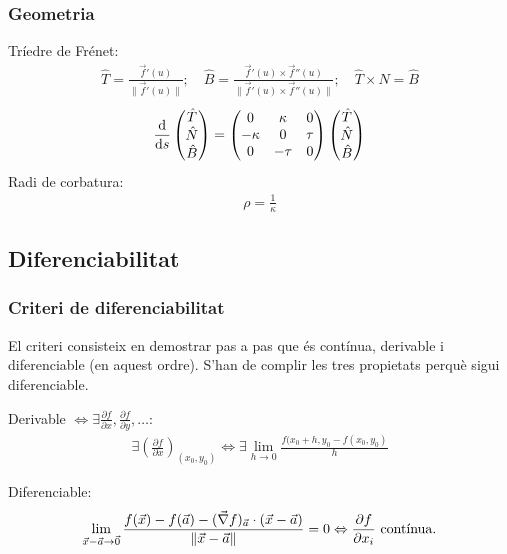\subsubsection*{Geometria}
Tríedre de Frénet:
\begin{align}
    \hat{T} = \frac{\vec{f}'(u)}{\| \vec{f}'(u) \|}; \quad \hat{B} = \frac{\vec{f}'(u) \times \vec{f}''(u)}{\| \vec{f}'(u) \times \vec{f}''(u) \|}; \quad \hat{T} \times \hat{N} = \hat{B}
\end{align}
\begin{align}
    \frac{\mathrm{d}}{\mathrm{d} s} \begin{pmatrix} \hat{T} \\ \hat{N} \\ \hat{B} \end{pmatrix} = \begin{pmatrix} 0 & \kappa & 0 \\ - \kappa & 0 & \tau \\ 0 & - \tau & 0 \end{pmatrix} \begin{pmatrix} \hat{T} \\ \hat{N} \\ \hat{B} \end{pmatrix}
\end{align}
Radi de corbatura:
\begin{align}
    \rho = \frac{1}{\kappa}    
\end{align}
\subsection*{Diferenciabilitat}
\subsubsection*{Criteri de diferenciabilitat}
El criteri consisteix en demostrar pas a pas que és contínua, derivable i diferenciable (en aquest ordre). S'han de complir les tres propietats perquè sigui diferenciable.

Derivable $\Leftrightarrow \exists \frac{\partial f}{\partial x}, \frac{\partial f}{\partial y}, \dots$:
\begin{align}
    \exists \left( \frac{\partial f}{\partial x} \right)_{(x_{0}, y_{0})} \Leftrightarrow \exists \lim_{h \to 0} \frac{f(x_{0}+h, y_{0} - f(x_{0},y_{0})}{h}
\end{align}

Diferenciable:
\begin{align}
    \lim_{\vec{x} - \vec{a} \to \vec{0}} \frac{f(\vec{x}) - f(\vec{a}) - (\vec{\nabla} f)_{\vec{a}} \cdot (\vec{x} - \vec{a})}{\| \vec{x} - \vec{a} \|} = 0 \Leftrightarrow \frac{\partial f}{\partial x_{i}} \text{ contínua.}
\end{align} 

